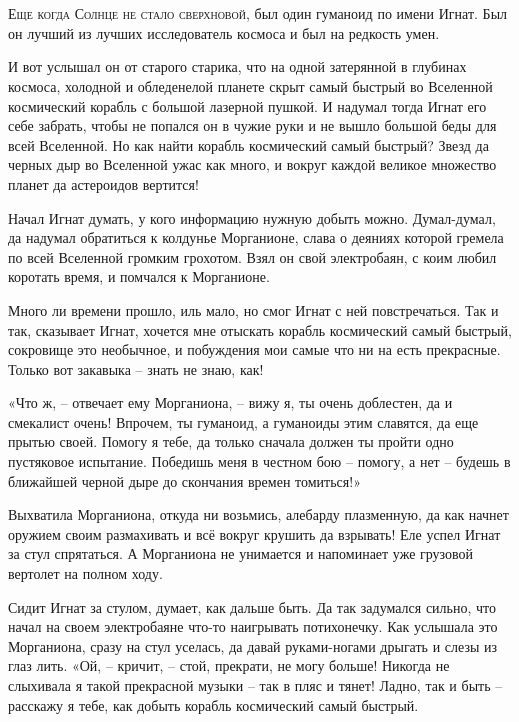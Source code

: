 \documentclass[ebook,oneside,final,openright]{memoir}
\begin{document}
\chapter{}
 \lettrine{Е}{ще когда Солнце не стало сверхновой,} был один гуманоид по имени Игнат. Был он лучший из лучших исследователь космоса и был на редкость умен.\par
\par
И вот услышал он от старого старика, что на одной затерянной в глубинах космоса, холодной и обледенелой планете скрыт самый быстрый во Вселенной космический корабль с большой лазерной пушкой. И надумал тогда Игнат его себе забрать, чтобы не попался он в чужие руки и не вышло большой беды для всей Вселенной. Но как найти корабль космический самый быстрый? Звезд да черных дыр во Вселенной ужас как много, и вокруг каждой великое множество планет да астероидов вертится!\par
\par
Начал Игнат думать, у кого информацию нужную добыть можно. Думал-думал, да надумал обратиться к колдунье Морганионе, слава о деяниях которой гремела по всей Вселенной громким грохотом. Взял он свой электробаян, с коим любил коротать время, и помчался к Морганионе.\par
\par
Много ли времени прошло, иль мало, но смог Игнат с ней повстречаться. Так и так, сказывает Игнат, хочется мне отыскать корабль космический самый быстрый, сокровище это необычное, и побуждения мои самые что ни на есть прекрасные. Только вот закавыка – знать не знаю, как!\par
\par
«Что ж, – отвечает ему Морганиона, – вижу я, ты очень доблестен, да и смекалист очень! Впрочем, ты гуманоид, а гуманоиды этим славятся, да еще прытью своей. Помогу я тебе, да только сначала должен ты пройти одно пустяковое испытание. Победишь меня в честном бою – помогу, а нет – будешь в ближайшей черной дыре до скончания времен томиться!» \par
\par
Выхватила Морганиона, откуда ни возьмись, алебарду плазменную, да как начнет оружием своим размахивать и всё вокруг крушить да взрывать! Еле успел Игнат за стул спрятаться. А Морганиона не унимается и напоминает уже грузовой вертолет на полном ходу. \par
\par
Сидит Игнат за стулом, думает, как дальше быть. Да так задумался сильно, что начал на своем электробаяне что-то наигрывать потихонечку. Как услышала это Морганиона, сразу на стул уселась, да давай руками-ногами дрыгать и слезы из глаз лить. «Ой, – кричит, – стой, прекрати, не могу больше! Никогда не слыхивала я такой прекрасной музыки – так в пляс и тянет! Ладно, так и быть – расскажу я тебе, как добыть корабль космический самый быстрый.\par
\end{document}
